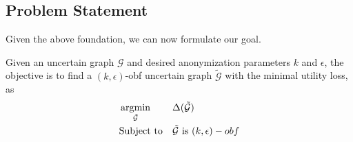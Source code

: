 \subsection{Problem Statement}
Given the above foundation, we can now formulate our goal.  
\vspace{-15pt}
\begin{problem}
     Given an uncertain graph $\mathcal{G}$ and desired anonymization parameters $k$ and $\epsilon$, 
     the objective is to find a  $(k,\epsilon)$-obf uncertain graph $\tilde{\mathcal{G}}$
     with the minimal utility loss, as 
     \vspace{-5pt}
     \begin{equation*}
             \begin{aligned}
                 & \argmin_{\tilde{
                \mathcal{G}}} & & \Delta(\tilde{\mathcal{G}}) \\
                &  \text{Subject to} & &\tilde{\mathcal{G}} \text{~is~} (k,\epsilon)-obf
            \end{aligned}
     \end{equation*}
     \label{prob:unobf}
\end{problem}
